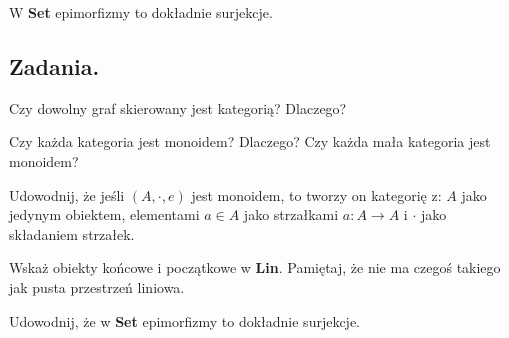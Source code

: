\begin{example}
	W \textbf{Set} epimorfizmy to dokładnie surjekcje.
\end{example}

\subsection{Zadania.}
\begin{exercise}
	Czy dowolny graf skierowany jest kategorią? Dlaczego?
\end{exercise}

\begin{exercise}
	Czy każda kategoria jest monoidem? Dlaczego? Czy każda mała kategoria jest monoidem?
\end{exercise}

\begin{exercise}
	Udowodnij, że jeśli $(A, \cdot, e)$ jest monoidem,
		to tworzy on kategorię z:
		$A$ jako jedynym obiektem,
		elementami $a \in A$ jako strzałkami $a: A \to A$
		i $\cdot$ jako składaniem strzałek.
\end{exercise}

\begin{exercise}
	Wskaż obiekty końcowe i początkowe w \textbf{Lin}.
	Pamiętaj, że nie ma czegoś takiego jak pusta przestrzeń liniowa.
\end{exercise}

\begin{exercise}
	Udowodnij, że w \textbf{Set} epimorfizmy to dokładnie surjekcje.
\end{exercise}

